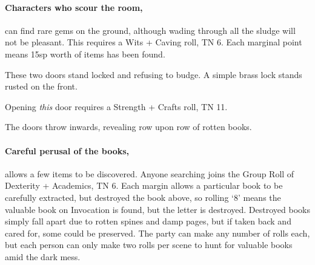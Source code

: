\begin{multicols}{2}


\paragraph{Characters who scour the room,}
can find rare gems on the ground, although wading through all the sludge will not be pleasant.
This requires a Wits + Caving roll, TN 6.
Each marginal point means 15sp worth of items has been found.


\begin{boxtext}

  These two doors stand locked and refusing to budge.  A simple brass lock stands rusted on the front.

\end{boxtext}

Opening \emph{this} door requires a Strength + Crafts roll, TN 11.

\begin{boxtext}
  The doors throw inwards, revealing row upon row of rotten books.
\end{boxtext}

\paragraph{Careful perusal of the books,}
allows a few items to be discovered.
Anyone searching joins the Group Roll of Dexterity + Academics, TN 6.
Each margin allows a particular book to be carefully extracted, but destroyed the book above, so rolling `8' means the valuable book on Invocation is found, but the letter is destroyed.
Destroyed books simply fall apart due to rotten spines and damp pages, but if taken back and cared for, some could be preserved.
The party can make any number of rolls each, but each person can only make two rolls per scene to hunt for valuable books amid the dark mess.

\begin{enumerate}


\end{enumerate}
\end{multicols}
